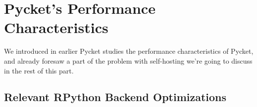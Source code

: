     \section{Pycket's Performance Characteristics}
        \begin{mainpoint}
            We introduced in earlier Pycket studies the performance characteristics of Pycket, and already foresaw a part of the problem with self-hosting we're going to discuss in the rest of this part.
        \end{mainpoint}

        \subsection{Relevant RPython Backend Optimizations}


